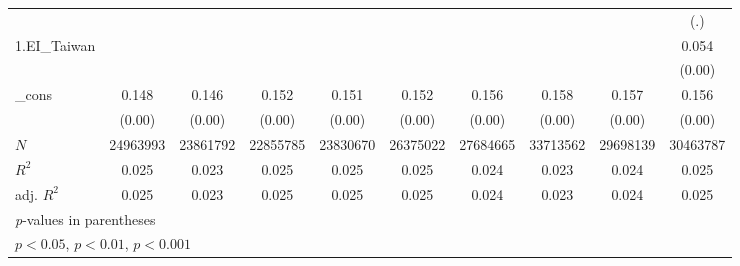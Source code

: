 {\begin{tabular}{l*{9}{c}}
          &                  &                  &                  &                  &                  &                  &                  &                  &      (.)         \\
[1em]
1.EI\_Taiwan#1.t06&                  &                  &                  &                  &                  &                  &                  &                  &    0.054\sym{***}\\
          &                  &                  &                  &                  &                  &                  &                  &                  &   (0.00)         \\
[1em]
\_cons    &    0.148\sym{***}&    0.146\sym{***}&    0.152\sym{***}&    0.151\sym{***}&    0.152\sym{***}&    0.156\sym{***}&    0.158\sym{***}&    0.157\sym{***}&    0.156\sym{***}\\
          &   (0.00)         &   (0.00)         &   (0.00)         &   (0.00)         &   (0.00)         &   (0.00)         &   (0.00)         &   (0.00)         &   (0.00)         \\
\hline
\(N\)     & 24963993         & 23861792         & 22855785         & 23830670         & 26375022         & 27684665         & 33713562         & 29698139         & 30463787         \\
\(R^{2}\) &    0.025         &    0.023         &    0.025         &    0.025         &    0.025         &    0.024         &    0.023         &    0.024         &    0.025         \\
adj. \(R^{2}\)&    0.025         &    0.023         &    0.025         &    0.025         &    0.025         &    0.024         &    0.023         &    0.024         &    0.025         \\
\hline\hline
\multicolumn{10}{l}{\footnotesize \textit{p}-values in parentheses}\\
\multicolumn{10}{l}{\footnotesize \sym{*} \(p<0.05\), \sym{**} \(p<0.01\), \sym{***} \(p<0.001\)}\\
\end{tabular}
}
